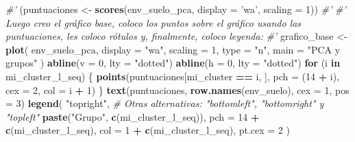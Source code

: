 \documentclass[11pt,]{article}
\newenvironment{Shaded}{\begin{snugshade}}{\end{snugshade}}
\newcommand{\KeywordTok}[1]{\textcolor[rgb]{0.13,0.29,0.53}{\textbf{#1}}}
\newcommand{\DataTypeTok}[1]{\textcolor[rgb]{0.13,0.29,0.53}{#1}}
\newcommand{\DecValTok}[1]{\textcolor[rgb]{0.00,0.00,0.81}{#1}}
\newcommand{\StringTok}[1]{\textcolor[rgb]{0.31,0.60,0.02}{#1}}
\newcommand{\CommentTok}[1]{\textcolor[rgb]{0.56,0.35,0.01}{\textit{#1}}}
\newcommand{\ControlFlowTok}[1]{\textcolor[rgb]{0.13,0.29,0.53}{\textbf{#1}}}
\newcommand{\OperatorTok}[1]{\textcolor[rgb]{0.81,0.36,0.00}{\textbf{#1}}}
\newcommand{\NormalTok}[1]{#1}
\begin{document}
\begin{Shaded}
\begin{Highlighting}[]
{{{{{\CommentTok{#' }
\NormalTok{(puntuaciones <-}\StringTok{ }\KeywordTok{scores}\NormalTok{(env_suelo_pca, }\DataTypeTok{display =} \StringTok{'wa'}\NormalTok{, }\DataTypeTok{scaling =} \DecValTok{1}\NormalTok{))}
\CommentTok{#'}
\CommentTok{#' Luego creo el gráfico base, coloco los puntos sobre el gráfico usando las puntuaciones, les coloco rótulos y, finalmente, coloco leyenda:}
\CommentTok{#'}
\NormalTok{grafico_base <-}\StringTok{ }\KeywordTok{plot}\NormalTok{(}
\NormalTok{  env_suelo_pca,}
  \DataTypeTok{display =} \StringTok{"wa"}\NormalTok{,}
  \DataTypeTok{scaling =} \DecValTok{1}\NormalTok{,}
  \DataTypeTok{type =} \StringTok{"n"}\NormalTok{,}
  \DataTypeTok{main =} \StringTok{"PCA y grupos"}
\NormalTok{)}
\KeywordTok{abline}\NormalTok{(}\DataTypeTok{v =} \DecValTok{0}\NormalTok{, }\DataTypeTok{lty =} \StringTok{"dotted"}\NormalTok{)}
\KeywordTok{abline}\NormalTok{(}\DataTypeTok{h =} \DecValTok{0}\NormalTok{, }\DataTypeTok{lty =} \StringTok{"dotted"}\NormalTok{)}
\ControlFlowTok{for}\NormalTok{ (i }\ControlFlowTok{in}\NormalTok{ mi_cluster_l_seq) \{}
  \KeywordTok{points}\NormalTok{(puntuaciones[mi_cluster }\OperatorTok{==}\StringTok{ }\NormalTok{i, ],}
         \DataTypeTok{pch =}\NormalTok{ (}\DecValTok{14} \OperatorTok{+}\StringTok{ }\NormalTok{i),}
         \DataTypeTok{cex =} \DecValTok{2}\NormalTok{,}
         \DataTypeTok{col =}\NormalTok{ i }\OperatorTok{+}\StringTok{ }\DecValTok{1}\NormalTok{)}
\NormalTok{\}}
\KeywordTok{text}\NormalTok{(puntuaciones, }\KeywordTok{row.names}\NormalTok{(env_suelo), }\DataTypeTok{cex =} \DecValTok{1}\NormalTok{, }\DataTypeTok{pos =} \DecValTok{3}\NormalTok{)}
\KeywordTok{legend}\NormalTok{(}
  \StringTok{"topright"}\NormalTok{, }\CommentTok{# Otras alternativas: "bottomleft", "bottomright" y "topleft"}
  \KeywordTok{paste}\NormalTok{(}\StringTok{"Grupo"}\NormalTok{, }\KeywordTok{c}\NormalTok{(mi_cluster_l_seq)),}
  \DataTypeTok{pch =} \DecValTok{14} \OperatorTok{+}\StringTok{ }\KeywordTok{c}\NormalTok{(mi_cluster_l_seq),}
  \DataTypeTok{col =} \DecValTok{1} \OperatorTok{+}\StringTok{ }\KeywordTok{c}\NormalTok{(mi_cluster_l_seq),}
  \DataTypeTok{pt.cex =} \DecValTok{2}
\NormalTok{)}

}}}}}
\end{Highlighting}
\end{Shaded}
\end{document}
